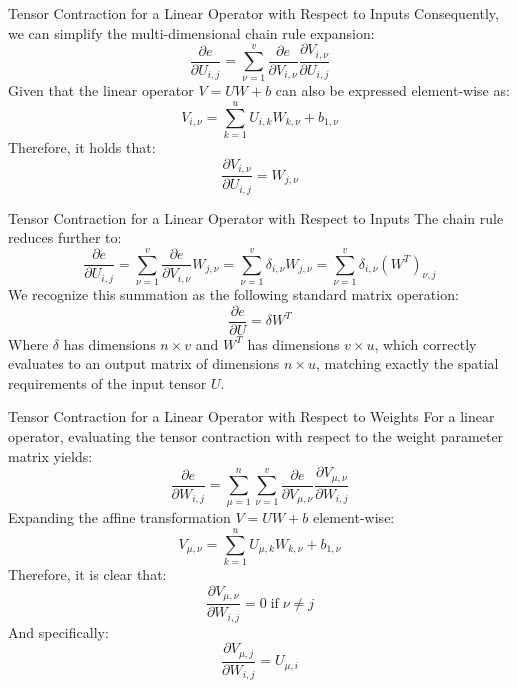\begin{frame}{Tensor Contraction for a Linear Operator with Respect to Inputs}
	Consequently, we can simplify the multi-dimensional chain rule expansion:
	\begin{equation*}
		\frac{\partial{e}}{\partial{U_{i,j}}} = \sum_{\nu=1}^v \frac{\partial{e}}{\partial{V_{i,\nu}}} \frac{\partial{V_{i,\nu}}}{\partial{U_{i,j}}}
	\end{equation*}
	\pause
	Given that the linear operator $V = U W + b$ can also be expressed element-wise as:
	\begin{equation*}
		V_{i,\nu} = \sum_{k=1}^u U_{i, k} W_{k, \nu} + b_{1,\nu}
	\end{equation*}
	Therefore, it holds that:
	\begin{equation*}
		\frac{\partial{V_{i,\nu}}}{\partial{U_{i,j}}} = W_{j, \nu}
	\end{equation*}
\end{frame}

\begin{frame}{Tensor Contraction for a Linear Operator with Respect to Inputs}
	The chain rule reduces further to:
	\begin{equation*}
		\frac{\partial{e}}{\partial{U_{i,j}}} = \sum_{\nu=1}^v \frac{\partial{e}}{\partial{V_{i,\nu}}} W_{j, \nu} = \sum_{\nu=1}^v \delta_{i,\nu} W_{j, \nu} = \sum_{\nu=1}^v \delta_{i,\nu} \left(W^T\right)_{\nu, j}
	\end{equation*}
	\pause
	We recognize this summation as the following standard matrix operation:
	\begin{equation*}
		\frac{\partial{e}}{\partial{U}} = \delta W^T
	\end{equation*}
	Where $\delta$ has dimensions $n \times v$ and $W^T$ has dimensions $v \times u$, which correctly evaluates to an output matrix of dimensions $n \times u$, matching exactly the spatial requirements of the input tensor $U$. 
\end{frame}

\begin{frame}{Tensor Contraction for a Linear Operator with Respect to Weights}
	For a linear operator, evaluating the tensor contraction with respect to the weight parameter matrix yields:
	\begin{equation*}
		\frac{\partial{e}}{\partial{W_{i,j}}} = \sum_{\mu=1}^n \sum_{\nu=1}^v \frac{\partial{e}}{\partial{V_{\mu,\nu}}} \frac{\partial{V_{\mu,\nu}}}{\partial{W_{i,j}}}
	\end{equation*}
	\pause
	Expanding the affine transformation $V = U W + b$ element-wise:
	\begin{equation*}
		V_{\mu,\nu} = \sum_{k=1}^u U_{\mu, k} W_{k, \nu} + b_{1,\nu}
	\end{equation*}
	\pause
	Therefore, it is clear that:
	\begin{equation*}
		\frac{\partial{V_{\mu,\nu}}}{\partial{W_{i,j}}} = 0 \; \text{if} \; \nu \ne j
	\end{equation*}
	\pause
	And specifically:
	\begin{equation*}
		\frac{\partial{V_{\mu,j}}}{\partial{W_{i,j}}} = U_{\mu,i}
	\end{equation*}	
\end{frame}

